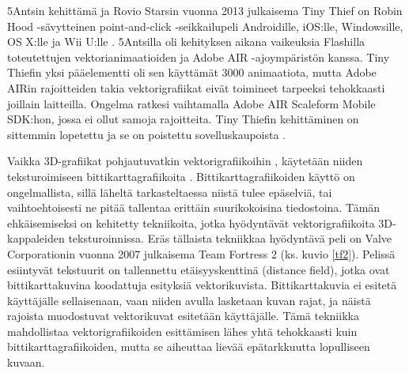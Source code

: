 \documentclass[utf8,bachelor]{gradu3}
\begin{document}
5Antsin kehittämä ja Rovio Starsin vuonna 2013 julkaisema Tiny Thief on Robin Hood -sävytteinen point-and-click -seikkailupeli Androidille, iOS:lle, Windowsille, OS X:lle ja Wii U:lle \parencites{RefWorks:doc:5bf09463e4b06df665225aeb}{RefWorks:doc:5bf0993ae4b0e21eda418a20}{RefWorks:doc:5bf099d4e4b08f3b86fd2aa3}. 5Antsilla oli kehityksen aikana vaikeuksia Flashilla toteutettujen vektorianimaatioiden ja Adobe AIR -ajoympäristön kanssa. Tiny Thiefin yksi pääelementti oli sen käyttämät 3000 animaatiota, mutta Adobe AIRin rajoitteiden takia vektorigrafiikat eivät toimineet tarpeeksi tehokkaasti joillain laitteilla. Ongelma ratkesi vaihtamalla Adobe AIR Scaleform Mobile SDK:hon, jossa ei ollut samoja rajoitteita. \parencites{RefWorks:doc:5bf09463e4b06df665225aeb}{RefWorks:doc:5bf093b3e4b093d9850ad715} Tiny Thiefin kehittäminen on sittemmin lopetettu ja se on poistettu sovelluskaupoista \parencite{RefWorks:doc:5bf0a115e4b09867bf4e3edb}.

Vaikka 3D-grafiikat pohjautuvatkin vektorigrafiikoihin \parencite{RefWorks:doc:5bdc5224e4b05afcfde5b159}, käytetään niiden teksturoimiseen bittikarttagrafiikoita \parencite{RefWorks:doc:5bf00b76e4b0b28cc7291a34}. Bittikarttagrafiikoiden käyttö on ongelmallista, sillä läheltä tarkasteltaessa niistä tulee epäselviä, tai vaihtoehtoisesti ne pitää tallentaa erittäin suurikokoisina tiedostoina. Tämän ehkäisemiseksi on kehitetty tekniikoita, jotka hyödyntävät vektorigrafiikoita 3D-kappaleiden teksturoinnissa. \parencite{RefWorks:doc:5bc4a5cbe4b0af09f17dfdc1} Eräs tällaista tekniikkaa hyödyntävä peli on Valve Corporationin vuonna 2007 julkaisema Team Fortress 2 (ks. kuvio \ref{tf2}). Pelissä esiintyvät tekstuurit on tallennettu etäisyyskenttinä (distance field), jotka ovat bittikarttakuvina koodattuja esityksiä vektorikuvista. Bittikarttakuvia ei esitetä käyttäjälle sellaisenaan, vaan niiden avulla lasketaan kuvan rajat, ja näistä rajoista muodostuvat vektorikuvat esitetään käyttäjälle. Tämä tekniikka mahdollistaa vektorigrafiikoiden esittämisen lähes yhtä tehokkaasti kuin bittikarttagrafiikoiden, mutta se aiheuttaa lievää epätarkkuutta lopulliseen kuvaan. \parencite{RefWorks:doc:5bc4a5cbe4b0af09f17dfdc1}
\end{document}
